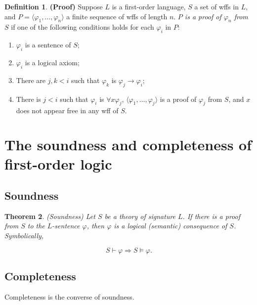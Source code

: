 \documentclass[10pt, a4paper, oneside]{article}
\newtheorem{thm}{Theorem}[section]
\theoremstyle{definition}
\newtheorem{dfn}[thm]{Definition}
\theoremstyle{remark}
\theoremstyle{plain}
\begin{document}
\begin{dfn}
    \textbf{(Proof)}
    Suppose $L$ is a first-order language, $S$ a set of wffs in $L$, and $P =
    \langle \varphi_1, \dotsc, \varphi_n \rangle$ a finite sequence of wffs of
    length $n$. \emph{$P$ is a proof of $\varphi_n$ from $S$} if one of the
    following conditions holds for each $\varphi_i$ in $P$:
    
    \begin{enumerate}
        \item $\varphi_i$ is a sentence of $S$;
        \item $\varphi_i$ is a logical axiom;
        \item There are $j, k < i$ such that $\varphi_k$ is $\varphi_j
              \rightarrow \varphi_i$;
        \item There is $j < i$ such that $\varphi_i$ is $\forall{x}\varphi_j$,
            $\langle \varphi_1, \dotsc, \varphi_j \rangle$ is a proof of
            $\varphi_j$ from $S$, and $x$ does not appear free in any wff of
            $S$.
    \end{enumerate}
\end{dfn}


\section{The soundness and completeness of first-order logic}

\subsection{Soundness}

\begin{thm}
    (Soundness) Let $S$ be a theory of signature $L$. If there is a proof from
    $S$ to the $L$-sentence $\varphi$, then $\varphi$ is a logical (semantic)
    consequence of $S$. Symbolically,
    
    \begin{displaymath}
        S \vdash \varphi \Longrightarrow S \models \varphi.
    \end{displaymath}
\end{thm}

\subsection{Completeness}

Completeness is the converse of soundness.
\end{document}
